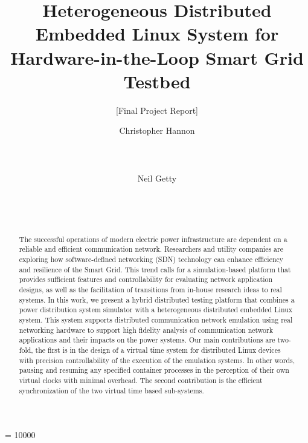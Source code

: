 \documentclass{sig-alternate-05-2015}
\begin{document}

\widowpenalty = 10000
\title{Heterogeneous Distributed Embedded Linux System for Hardware-in-the-Loop Smart Grid Testbed}
\subtitle{[Final Project Report]}



\author{
\alignauthor
Christopher Hannon\\
       \\
       \\
       \\
\alignauthor
Neil Getty\\
       \\
       \\
       \\
}


\maketitle

\begin{abstract}
The successful operations of modern electric power infrastructure are dependent on a reliable and efficient communication network. Researchers and utility companies are exploring how software-defined networking (SDN) technology can enhance efficiency and resilience of the Smart Grid. This trend calls for a simulation-based platform that provides sufficient features and controllability for evaluating network application designs, as well as the facilitation of transitions from in-house research ideas to real systems. In this work, we present a hybrid distributed testing platform that combines a power distribution system simulator with a heterogeneous distributed embedded Linux system. This system supports distributed communication network emulation using real networking hardware to support high fidelity analysis of communication network applications and their impacts on the power systems. Our main contributions are two-fold, the first is in the design of a virtual time system for distributed Linux devices with precision controllability of the execution of the emulation systems. In other words, pausing and resuming any specified container processes in the perception of their own virtual clocks with minimal overhead. The second contribution is the efficient synchronization of the two virtual time based sub-systems.
\end{abstract}
\end{document}
